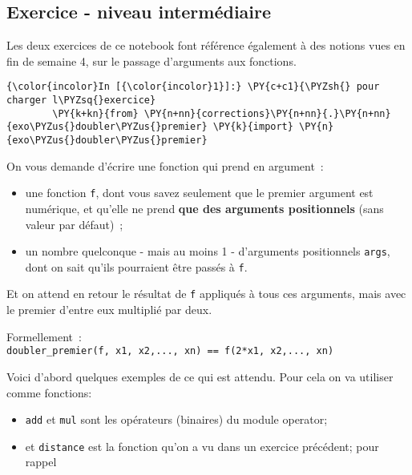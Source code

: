    
    
    
    

    

    \hypertarget{exercice---niveau-intermuxe9diaire}{%
\subsection{Exercice - niveau
intermédiaire}\label{exercice---niveau-intermuxe9diaire}}

    Les deux exercices de ce notebook font référence également à des notions
vues en fin de semaine 4, sur le passage d'arguments aux fonctions.

    \begin{Verbatim}[commandchars=\\\{\}]
{\color{incolor}In [{\color{incolor}1}]:} \PY{c+c1}{\PYZsh{} pour charger l\PYZsq{}exercice}
        \PY{k+kn}{from} \PY{n+nn}{corrections}\PY{n+nn}{.}\PY{n+nn}{exo\PYZus{}doubler\PYZus{}premier} \PY{k}{import} \PY{n}{exo\PYZus{}doubler\PYZus{}premier}
\end{Verbatim}


    On vous demande d'écrire une fonction qui prend en argument~:

\begin{itemize}
\tightlist
\item
  une fonction \texttt{f}, dont vous savez seulement que le premier
  argument est numérique, et qu'elle ne prend \textbf{que des arguments
  positionnels} (sans valeur par défaut)~;
\item
  un nombre quelconque - mais au moins 1 - d'arguments positionnels
  \texttt{args}, dont on sait qu'ils pourraient être passés à
  \texttt{f}.
\end{itemize}

Et on attend en retour le résultat de \texttt{f} appliqués à tous ces
arguments, mais avec le premier d'entre eux multiplié par deux.

Formellement~:
\texttt{doubler\_premier(f,\ x1,\ x2,...,\ xn)\ ==\ f(2*x1,\ x2,...,\ xn)}

    Voici d'abord quelques exemples de ce qui est attendu. Pour cela on va
utiliser comme fonctions:

\begin{itemize}
\tightlist
\item
  \texttt{add} et \texttt{mul} sont les opérateurs (binaires) du module
  operator;
\item
  et \texttt{distance} est la fonction qu'on a vu dans un exercice
  précédent; pour rappel
\end{itemize}

